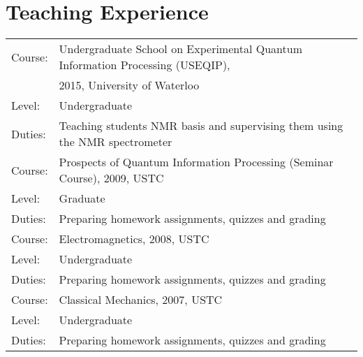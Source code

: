 \documentclass[a4paper,10pt]{article}
\begin{document}
\section{Teaching Experience}
\medskip
\begin{tabular}{ll}
Course: &Undergraduate School on Experimental Quantum Information Processing (USEQIP),\\
&2015, University of Waterloo\\
Level: &Undergraduate\\
\medskip
Duties: &Teaching students NMR basis and supervising  them using the NMR spectrometer\\
Course: &Prospects of Quantum Information Processing (Seminar Course), 2009, USTC\\
Level: &Graduate\\
\medskip
Duties: &Preparing homework assignments, quizzes and grading\\
Course: &Electromagnetics, 2008, USTC\\
Level: &Undergraduate\\
\medskip
Duties: &Preparing homework assignments, quizzes and grading\\
Course: &Classical Mechanics, 2007, USTC\\
Level: &Undergraduate\\
Duties: &Preparing homework assignments, quizzes and grading\\
\end{tabular}

\newpage
\end{document}

